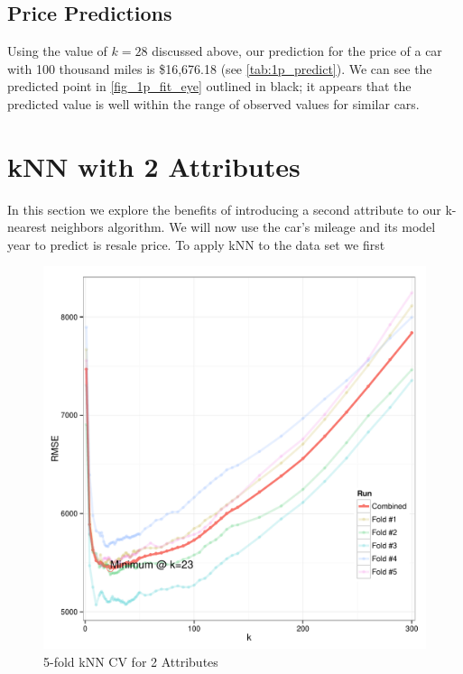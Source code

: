 \documentclass[11pt, fleqn]{article}
\begin{document}
\subsection{Price Predictions}

Using the value of $k=28$ discussed above, our prediction for the price of a car with 100 thousand miles is \$16,676.18 (see \cref{tab:1p_predict}). We can see the predicted point in \cref{fig_1p_fit_eye} outlined in black; it appears that the predicted value is well within the range of observed values for similar cars.



\section{kNN with 2 Attributes}

In this section we explore the benefits of introducing a second attribute to our k-nearest neighbors algorithm. We will now use the car's mileage and its model year to predict is resale price.  To apply kNN to the data set we first 



\begin{figure}[!htb]
  \centering
  \includegraphics[scale=.5]{2p_cv_k.pdf}
  \caption{5-fold kNN CV for 2 Attributes}
  \label{fig:2p_k}
\end{figure}
\end{document}
